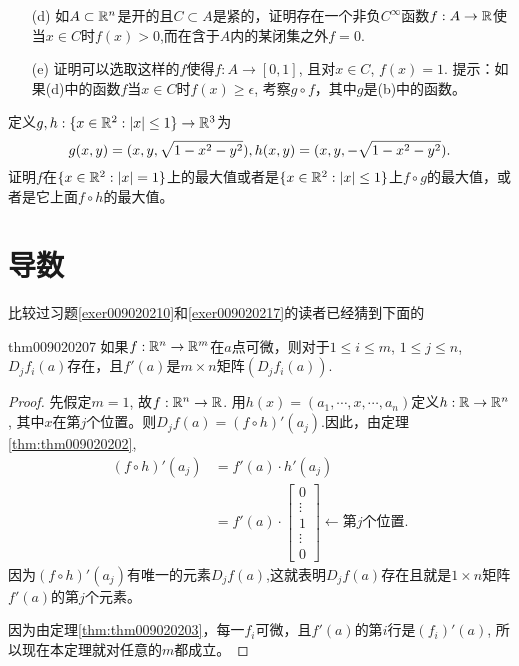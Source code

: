 \begin{problemset}
\begin{enumerate}
\item[(d)] 如$A \subset \mathbb{R}^n$是开的且$C \subset A$是紧的，证明存在一个非负$C^{\infty}$函数$f:A \to \mathbb{R}$使当$x \in C$时$f(x) > 0$,而在含于$A$内的某闭集之外$f = 0$.

\item[(e)] 证明可以选取这样的$f$使得$f:A \to [0, 1]$, 且对$x \in C$, $f(x)=1$. 提示：如果(d)中的函数$f$当$x \in C$时$f(x) \ge \epsilon$, 考察$g \circ f$，其中$g$是(b)中的函数。
\end{enumerate}

\item\label{exer009020227} 定义$g,h:\{x \in \mathbb{R}^2 : |x| \le 1\} \to \mathbb{R}^3$为
\begin{equation*}
g(x, y) = (x, y, \sqrt{1 - x^2 - y^2}),\\
h(x, y) = (x, y, -\sqrt{1 - x^2 - y^2}).
\end{equation*}
证明$f$在$\{x \in \mathbb{R}^2 : |x| = 1\}$上的最大值或者是$\{x \in \mathbb{R}^2:|x| \le 1\}$上$f \circ g$的最大值，或者是它上面$f \circ h$的最大值。


\end{problemset}

\section{导数}\label{section0090204}
比较过习题\ref{exer009020210}和\ref{exer009020217}的读者已经猜到下面的
\begin{theorem}{}{thm009020207}
如果$f:\mathbb{R}^n \to \mathbb{R}^m$在$a$点可微，则对于$1 \le i \le m$, $1 \le j \le n$, $D_jf_i(a)$存在，且$f'(a)$是$m \times n$矩阵$(D_jf_i(a))$.
\end{theorem}
\begin{proof}
先假定$m=1$, 故$f: \mathbb{R}^n \to \mathbb{R}$. 用$h(x)=(a_1, \cdots, x, \cdots, a_n)$定义$h:\mathbb{R} \to \mathbb{R}^n$, 其中$x$在第$j$个位置。则$D_jf(a) = (f \circ h)'(a_j)$.因此，由定理\ref{thm:thm009020202},
\[
\begin{aligned}
(f \circ h)'(a_j) &= f'(a) \cdot h'(a_j)\\
&= f'(a) \cdot \begin{bmatrix}0 \\\vdots\\1\\\vdots\\0\end{bmatrix}\leftarrow\text{第$j$个位置}.
\end{aligned}
\]
因为$(f \circ h)'(a_j)$有唯一的元素$D_jf(a)$,这就表明$D_jf(a)$存在且就是$1 \times n$矩阵$f'(a)$的第$j$个元素。

因为由定理\ref{thm:thm009020203}，每一$f_i$可微，且$f'(a)$的第$i$行是$(f_i)'(a)$, 所以现在本定理就对任意的$m$都成立。
\end{proof}

